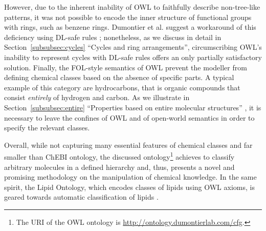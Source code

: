 \documentclass[10pt]{bmc_article}
\newenvironment{bmcformat}{\baselineskip20pt\sloppy\setboolean{publ}{false}}{\baselineskip20pt\sloppy}
\begin{document}
\begin{bmcformat}
However, due to the inherent inability of OWL to faithfully describe non-tree-like patterns, it was not possible to encode  the inner structure of functional groups with rings, such as benzene rings. Dumontier et al. suggest a workaround of this deficiency using DL-safe rules \cite{dumontier2007}; nonetheless, as we discuss in detail in Section~\ref{subsubsec:cycles} ``Cycles and ring arrangements'', circumscribing OWL's inability to represent cycles with DL-safe rules offers an only partially satisfactory solution. Finally, the FOL-style semantics of OWL prevent the modeller from defining chemical classes based on the absence of specific parts. A typical example of this category are hydrocarbons, that is organic compounds that consist \emph{entirely} of hydrogen and carbon. As we illustrate in Section~\ref{subsubsec:entire} ``Properties based on entire molecular structures'' , it is necessary to leave the confines of OWL and of open-world semantics in order to specify the relevant classes. 

Overall, while not capturing many essential features of chemical classes and far smaller than ChEBI ontology, the discussed ontology\footnote{The URI of the OWL ontology \cite{dumontier2007} is \url{http://ontology.dumontierlab.com/cfg}.} achieves to classify arbitrary molecules in a defined hierarchy and, thus, presents a novel and promising methodology on the manipulation of chemical knowledge. In the same spirit, the Lipid Ontology, which encodes classes of lipids using OWL axioms, is geared towards automatic classification of lipids \cite{chepelevlipids2011}.
 


 




\end{bmcformat}
\end{document}
